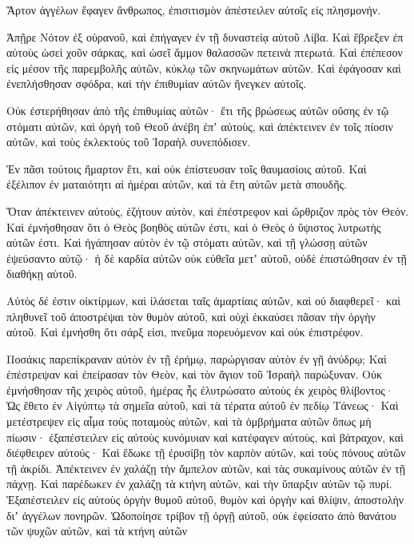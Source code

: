 {Ἄρτον ἀγγέλων ἔφαγεν ἄνθρωπος, ἐπισιτισμὸν ἀπέστειλεν αὐτοῖς εἰς πλησμονήν.
\par }{\PP {}Ἀπῇρε Νότον ἐξ οὐρανοῦ, καὶ ἐπήγαγεν ἐν τῇ δυναστείᾳ
αὐτοῦ Λίβα. Καὶ ἔβρεξεν ἐπ αὐτοὺς ὡσεὶ χοῦν σάρκας, καὶ ὡσεῖ ἄμμον θαλασσῶν πετεινὰ πτερωτά.
Καὶ ἐπέπεσον εἰς μέσον τῆς παρεμβολῆς αὐτῶν, κύκλῳ τῶν σκηνωμάτων αὐτῶν.
Καὶ ἐφάγοσαν καὶ ἐνεπλήσθησαν σφόδρα, καὶ τὴν ἐπιθυμίαν αὐτῶν ἤνεγκεν αὐτοῖς.
\par }{\PP {}Οὐκ ἐστερήθησαν ἀπὸ τῆς ἐπιθυμίας αὐτῶν· ἔτι τῆς βρώσεως
αὐτῶν οὔσης ἐν τῷ στόματι αὐτῶν, καὶ ὀργὴ τοῦ Θεοῦ ἀνέβη ἐπʼ αὐτοὺς, καὶ ἀπέκτεινεν ἐν τοῖς πίοσιν αὐτῶν, καὶ τοὺς ἐκλεκτοὺς τοῦ Ἰσραὴλ συνεπόδισεν.
\par }{\PP {}Ἐν πᾶσι τούτοις ἥμαρτον ἔτι, καὶ οὐκ ἐπίστευσαν τοῖς
θαυμασίοις αὐτοῦ. Καὶ ἐξέλιπον ἐν ματαιότητι αἱ ἡμέραι αὐτῶν, καὶ τὰ ἔτη αὐτῶν μετὰ σπουδῆς.
\par }{\PP {}Ὅταν ἀπέκτεινεν αὐτοὺς, ἐζήτουν αὐτὸν, καὶ ἐπέστρεφον καὶ
ὤρθριζον πρὸς τὸν Θεόν. Καὶ ἐμνήσθησαν ὅτι ὁ Θεὸς βοηθὸς αὐτῶν ἐστι, καὶ ὁ Θεὸς ὁ ὕψιστος λυτρωτὴς αὐτῶν ἐστι.
Καὶ ἠγάπησαν αὐτὸν ἐν τῷ στόματι αὐτῶν, καὶ τῇ γλώσσῃ αὐτῶν
ἐψεύσαντο αὐτῷ· ἡ δὲ καρδία αὐτῶν οὐκ εὐθεῖα μετʼ αὐτοῦ, οὐδὲ ἐπιστώθησαν ἐν τῇ διαθήκῃ αὐτοῦ.
\par }{\PP {}Αὐτὸς δέ ἐστιν οἰκτίρμων, καὶ ἱλάσεται ταῖς ἁμαρτίαις αὐτῶν, καὶ οὐ διαφθερεῖ· καὶ πληθυνεῖ τοῦ ἀποστρέψαι τὸν θυμὸν αὐτοῦ, καὶ οὐχὶ ἐκκαύσει πᾶσαν τὴν ὀργὴν αὐτοῦ.
Καὶ ἐμνήσθη ὅτι σάρξ εἰσι, πνεῦμα πορευόμενον καὶ οὐκ ἐπιστρέφον.
\par }{\PP {}Ποσάκις παρεπίκραναν αὐτὸν ἐν τῇ ἐρήμῳ, παρώργισαν
αὐτὸν ἐν γῇ ἀνύδρῳ; Καὶ ἐπέστρεψαν καὶ ἐπείρασαν τὸν Θεὸν, καὶ τὸν ἅγιον τοῦ Ἰσραὴλ παρώξυναν.
Οὐκ ἐμνήσθησαν τῆς χειρὸς αὐτοῦ, ἡμέρας ἧς ἐλυτρώσατο αὐτοὺς ἐκ χειρὸς θλίβοντος·
Ὡς ἔθετο ἐν Αἰγύπτῳ τὰ σημεῖα αὐτοῦ, καὶ τὰ
τέρατα αὐτοῦ ἐν πεδίῳ Τάνεως· Καὶ μετέστρεψεν εἰς αἷμα τοὺς ποταμοὺς αὐτῶν, καὶ τὰ ὀμβρήματα αὐτῶν ὅπως μὴ πίωσιν·
ἐξαπέστειλεν εἰς αὐτοὺς κυνόμυιαν καὶ κατέφαγεν αὐτοὺς, καὶ βάτραχον, καὶ διέφθειρεν αὐτούς·
Καὶ ἔδωκε τῇ ἐρυσίβῃ τὸν καρπὸν αὐτῶν, καὶ τοὺς πόνους αὐτῶν τῇ ἀκρίδι.
Ἀπέκτεινεν ἐν χαλάζῃ τὴν ἄμπελον αὐτῶν, καὶ τὰς συκαμίνους αὐτῶν ἐν
τῇ πάχνῃ. Καὶ παρέδωκεν ἐν χαλάζῃ τὰ κτήνη αὐτῶν, καὶ τὴν ὕπαρξιν αὐτῶν τῷ πυρί.
Ἐξαπέστειλεν εἰς αὐτοὺς ὀργὴν θυμοῦ αὐτοῦ, θυμὸν καὶ ὀργὴν καὶ θλίψιν, ἀποστολὴν διʼ
ἀγγέλων πονηρῶν. Ὡδοποίησε τρίβον τῇ ὀργῇ αὐτοῦ, οὐκ ἐφείσατο ἀπὸ θανάτου τῶν ψυχῶν αὐτῶν, καὶ τὰ κτήνη αὐτῶν
}
